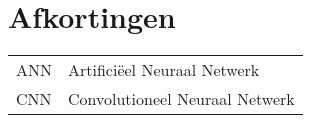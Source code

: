 \chapter{Afkortingen}

\renewcommand{\baselinestretch}{1.5}
\small\normalsize
\begin{longtable}{ll}
	ANN & Artifici\"eel Neuraal Netwerk \\
	CNN & Convolutioneel Neuraal Netwerk \\
\end{longtable}

